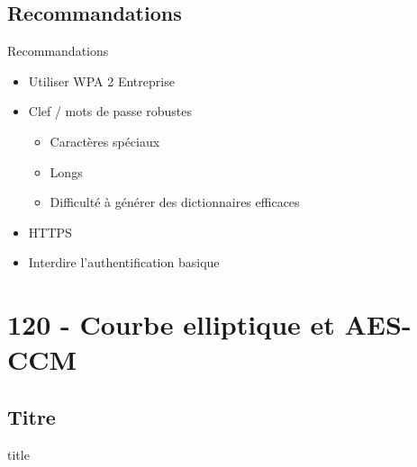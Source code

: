 \documentclass[10pt,sans,usenames,dvipsnames,french,compress]{beamer}
\begin{document}
\subsection{Recommandations}
\begin{frame}{Recommandations}
	\begin{itemize}
		\item<2-> Utiliser WPA 2 Entreprise
		\item<3-> Clef / mots de passe robustes
		\begin{itemize}
			\item<4-> Caractères spéciaux
			\item<5-> Longs
			\item<6-> Difficulté à générer des dictionnaires efficaces
		\end{itemize}
		\item<7-> HTTPS
		\item<8-> Interdire l'authentification basique
	\end{itemize}
\end{frame}

\section{120 - Courbe elliptique et AES-CCM}
\subsection{Titre}
\begin{frame}
	\begin{beamercolorbox}[sep=8pt,center]{title}
	\end{beamercolorbox}
\end{frame}
\end{document}
